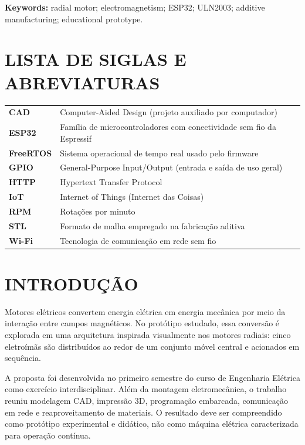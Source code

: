 \documentclass[12pt,a4paper,oneside]{article}
\begin{document}
\noindent\textbf{Keywords:} radial motor; electromagnetism; ESP32; ULN2003; additive manufacturing; educational prototype.
\clearpage

\listoffigures
{}
\clearpage

\section*{LISTA DE SIGLAS E ABREVIATURAS}
\begin{tabularx}{\textwidth}{>{\bfseries}l Y}
CAD & Computer-Aided Design (projeto auxiliado por computador)\\
ESP32 & Família de microcontroladores com conectividade sem fio da Espressif\\
FreeRTOS & Sistema operacional de tempo real usado pelo firmware\\
GPIO & General-Purpose Input/Output (entrada e saída de uso geral)\\
HTTP & Hypertext Transfer Protocol\\
IoT & Internet of Things (Internet das Coisas)\\
RPM & Rotações por minuto\\
STL & Formato de malha empregado na fabricação aditiva\\
Wi-Fi & Tecnologia de comunicação em rede sem fio\\
\end{tabularx}
\clearpage

\tableofcontents
\clearpage
{}

\section{INTRODUÇÃO}

Motores elétricos convertem energia elétrica em energia mecânica por meio da interação entre campos magnéticos. No protótipo estudado, essa conversão é explorada em uma arquitetura inspirada visualmente nos motores radiais: cinco eletroímãs são distribuídos ao redor de um conjunto móvel central e acionados em sequência.

A proposta foi desenvolvida no primeiro semestre do curso de Engenharia Elétrica como exercício interdisciplinar. Além da montagem eletromecânica, o trabalho reuniu modelagem CAD, impressão 3D, programação embarcada, comunicação em rede e reaproveitamento de materiais. O resultado deve ser compreendido como protótipo experimental e didático, não como máquina elétrica caracterizada para operação contínua.
\end{document}
